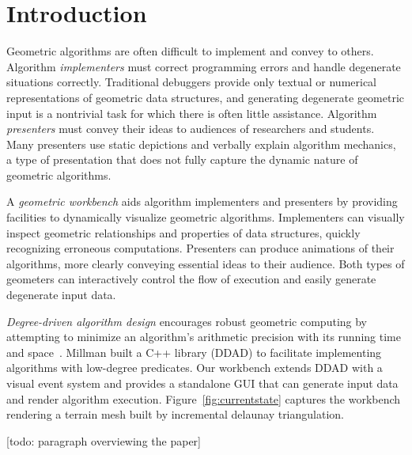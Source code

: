\section{Introduction}

Geometric algorithms are often difficult to implement and convey to others.
Algorithm \emph{implementers} must correct programming errors and handle
degenerate situations correctly. Traditional debuggers provide only textual or
numerical representations of geometric data structures, and generating
degenerate geometric input is a nontrivial task for which there is often little
assistance. Algorithm \emph{presenters} must convey their ideas to audiences of
researchers and students. Many presenters use static depictions and verbally
explain algorithm mechanics, a type of presentation that does not fully capture
the dynamic nature of geometric algorithms.

A \emph{geometric workbench} aids algorithm implementers and presenters by
providing facilities to dynamically visualize geometric algorithms. Implementers
can visually inspect geometric relationships and properties of data structures,
quickly recognizing erroneous computations. Presenters can produce
animations of their algorithms, more clearly conveying essential
ideas to their audience. Both types of geometers can interactively control the
flow of execution and easily generate degenerate input data.


\emph{Degree-driven algorithm design} encourages robust geometric computing by
attempting to minimize an algorithm's arithmetic precision with its running time
and space~\cite{millman2012degree}. Millman built a C++ library (DDAD) to
facilitate implementing algorithms with low-degree predicates. Our workbench
extends DDAD with a visual event system and provides a standalone GUI that can
generate input data and render algorithm execution.
Figure~\ref{fig:currentstate} captures the workbench rendering a terrain mesh
built by incremental delaunay triangulation.

[todo: paragraph overviewing the paper]

